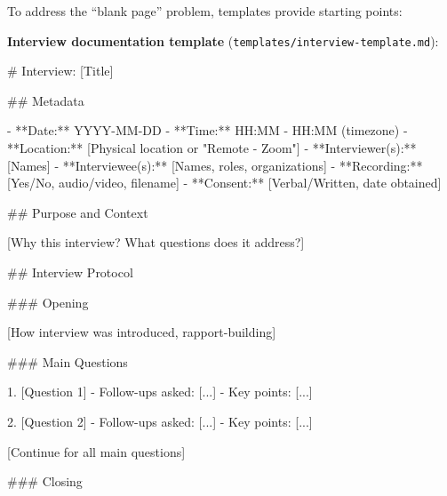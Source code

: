 \documentclass[
  oneside,
  open=any]{scrbook}
\newenvironment{Shaded}{\begin{snugshade}}{\end{snugshade}}
\newcommand{\CommentTok}[1]{\textcolor[rgb]{0.37,0.37,0.37}{#1}}
\newcommand{\FunctionTok}[1]{\textcolor[rgb]{0.28,0.35,0.67}{#1}}
\newcommand{\NormalTok}[1]{\textcolor[rgb]{0.00,0.23,0.31}{#1}}
\newcommand{\OtherTok}[1]{\textcolor[rgb]{0.00,0.23,0.31}{#1}}
\newcommand{\SpecialStringTok}[1]{\textcolor[rgb]{0.13,0.47,0.30}{#1}}
\begin{document}
To address the ``blank page'' problem, templates provide starting
points:

\textbf{Interview documentation template}
(\texttt{templates/interview-template.md}):

\begin{Shaded}
\begin{Highlighting}[]
\FunctionTok{\# Interview: [Title]}

\FunctionTok{\#\# Metadata}

\SpecialStringTok{{-} }\NormalTok{**Date:** YYYY{-}MM{-}DD}
\SpecialStringTok{{-} }\NormalTok{**Time:** HH:MM {-} HH:MM (timezone)}
\SpecialStringTok{{-} }\NormalTok{**Location:** }\CommentTok{[}\OtherTok{Physical location or "Remote {-} Zoom"}\CommentTok{]}
\SpecialStringTok{{-} }\NormalTok{**Interviewer(s):** }\CommentTok{[}\OtherTok{Names}\CommentTok{]}
\SpecialStringTok{{-} }\NormalTok{**Interviewee(s):** }\CommentTok{[}\OtherTok{Names, roles, organizations}\CommentTok{]}
\SpecialStringTok{{-} }\NormalTok{**Recording:** }\CommentTok{[}\OtherTok{Yes/No, audio/video, filename}\CommentTok{]}
\SpecialStringTok{{-} }\NormalTok{**Consent:** }\CommentTok{[}\OtherTok{Verbal/Written, date obtained}\CommentTok{]}

\FunctionTok{\#\# Purpose and Context}

\CommentTok{[}\OtherTok{Why this interview? What questions does it address?}\CommentTok{]}

\FunctionTok{\#\# Interview Protocol}

\FunctionTok{\#\#\# Opening}

\CommentTok{[}\OtherTok{How interview was introduced, rapport{-}building}\CommentTok{]}

\FunctionTok{\#\#\# Main Questions}

\SpecialStringTok{1. }\CommentTok{[}\OtherTok{Question 1}\CommentTok{]}
\SpecialStringTok{   {-} }\NormalTok{Follow{-}ups asked: }\CommentTok{[}\OtherTok{...}\CommentTok{]}
\SpecialStringTok{   {-} }\NormalTok{Key points: }\CommentTok{[}\OtherTok{...}\CommentTok{]}

\SpecialStringTok{2. }\CommentTok{[}\OtherTok{Question 2}\CommentTok{]}
\SpecialStringTok{   {-} }\NormalTok{Follow{-}ups asked: }\CommentTok{[}\OtherTok{...}\CommentTok{]}
\SpecialStringTok{   {-} }\NormalTok{Key points: }\CommentTok{[}\OtherTok{...}\CommentTok{]}

\CommentTok{[}\OtherTok{Continue for all main questions}\CommentTok{]}

\FunctionTok{\#\#\# Closing}


\end{Highlighting}
\end{Shaded}
\end{document}
